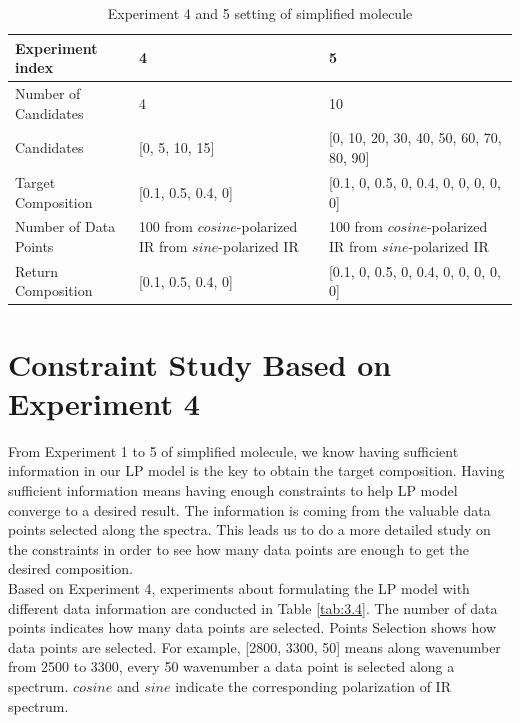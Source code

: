 \begin{table} \small 
\begin{center}
\begin{tabular}{| l | p{5cm} | p{6cm} |}
\hline
Experiment index & 4 & 5\\
\hline
Number of Candidates & 4 & 10 \\
\hline
Candidates & [0, 5, 10, 15] & [0, 10, 20, 30, 40, 50, 60, 70, 80, 90] \\
\hline
Target Composition & [0.1, 0.5, 0.4, 0] & [0.1, 0, 0.5, 0, 0.4, 0, 0, 0, 0, 0]\\
\hline
Number of Data Points & 100 from $cosine$-polarized IR \newline 100 from $sine$-polarized IR & 100 from $cosine$-polarized IR \newline 100 from $sine$-polarized IR\\
\hline
Return Composition & [0.1, 0.5, 0.4, 0] & [0.1, 0, 0.5, 0, 0.4, 0, 0, 0, 0, 0] \\
\hline
\end{tabular} 
\caption{Experiment 4 and 5 setting of simplified molecule}\label{tab:3.3}
\end{center}
\end{table}		

\section{Constraint Study Based on Experiment 4}

From Experiment 1 to 5 of simplified molecule, we know having sufficient information in our LP model is the key to obtain the target composition. Having sufficient information means having enough constraints to help LP model converge to a desired result. The information is coming from the valuable data points selected along the spectra. This leads us to do a more detailed study on the constraints in order to see how many data points are enough to get the desired composition.\\ 

Based on Experiment 4, experiments about formulating the LP model with different data information are conducted in Table \ref{tab:3.4}. The number of data points indicates how many data points are selected. Points Selection shows how data points are selected. For example, [2800, 3300, 50] means along wavenumber from 2500 to 3300, every 50 wavenumber a data point is selected along a spectrum. $cosine$ and $sine$ indicate the corresponding polarization of IR spectrum. \\

